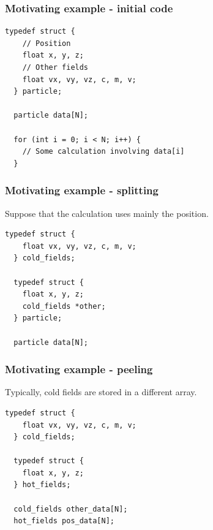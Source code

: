 \begin{frame}[fragile]
\frametitle{Motivating example - initial code}

\begin{lstlisting}[style=Cstyle]
  typedef struct {
    // Position
    float x, y, z;
    // Other fields
    float vx, vy, vz, c, m, v;
  } particle;

  particle data[N];

  for (int i = 0; i < N; i++) {
    // Some calculation involving data[i]
  }
\end{lstlisting}

\end{frame}


\begin{frame}[fragile]
\frametitle{Motivating example - splitting}

Suppose that the calculation uses mainly the position.

\bigskip

\begin{lstlisting}[style=Cstyle]
  typedef struct {
    float vx, vy, vz, c, m, v;
  } cold_fields;

  typedef struct {
    float x, y, z;
    cold_fields *other;
  } particle;

  particle data[N];
\end{lstlisting}

\end{frame}


\begin{frame}[fragile]
\frametitle{Motivating example - peeling}

Typically, cold fields are stored in a different array.

\begin{lstlisting}[style=Cstyle]
  typedef struct {
    float vx, vy, vz, c, m, v;
  } cold_fields;

  typedef struct {
    float x, y, z;
  } hot_fields;

  cold_fields other_data[N];
  hot_fields pos_data[N];
\end{lstlisting}

\end{frame}


